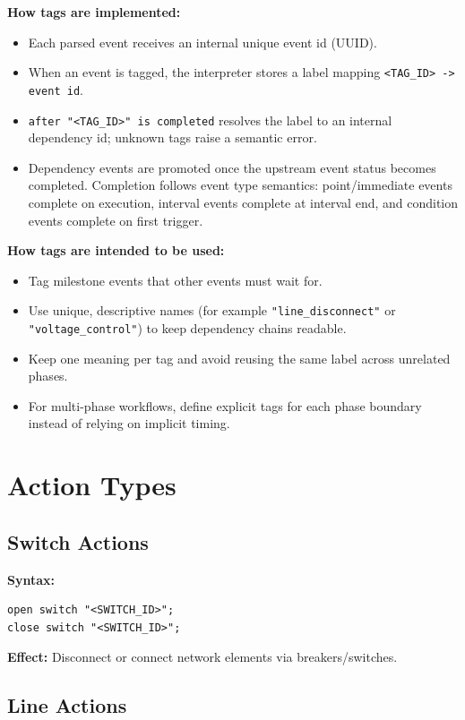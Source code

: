 \documentclass[12pt]{article}
\begin{document}
\textbf{How tags are implemented:}
\begin{itemize}
  \item Each parsed event receives an internal unique event id (UUID).
  \item When an event is tagged, the interpreter stores a label mapping \texttt{<TAG\_ID> -> event id}.
  \item \texttt{after "<TAG\_ID>" is completed} resolves the label to an internal dependency id; unknown tags
        raise a semantic error.
  \item Dependency events are promoted once the upstream event status becomes completed. Completion follows event
        type semantics: point/immediate events complete on execution, interval events complete at interval end,
        and condition events complete on first trigger.
\end{itemize}

\textbf{How tags are intended to be used:}
\begin{itemize}
  \item Tag milestone events that other events must wait for.
  \item Use unique, descriptive names (for example \texttt{"line\_disconnect"} or \texttt{"voltage\_control"}) to
        keep dependency chains readable.
  \item Keep one meaning per tag and avoid reusing the same label across unrelated phases.
  \item For multi-phase workflows, define explicit tags for each phase boundary instead of relying on implicit
        timing.
\end{itemize}

\section{Action Types}

\subsection{Switch Actions}

\textbf{Syntax:}
\begin{lstlisting}
open switch "<SWITCH_ID>";
close switch "<SWITCH_ID>";
\end{lstlisting}

\textbf{Effect:} Disconnect or connect network elements via breakers/switches.

\subsection{Line Actions}
\end{document}
